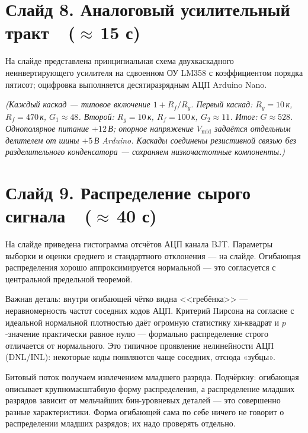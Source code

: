 \documentclass[12pt,a4paper]{extarticle}
\newcommand{\note}[1]{%
  \par
  {\small\color{noteclr}\itshape (#1)}%
  \par}
\begin{document}
\section*{Слайд 8. Аналоговый усилительный тракт~~($\approx$\,15 с)}

На слайде представлена принципиальная схема двухкаскадного неинвертирующего
усилителя на сдвоенном ОУ LM358 с коэффициентом порядка пятисот; оцифровка
выполняется десятиразрядным АЦП Arduino Nano.

\note{Каждый каскад --- типовое включение $1+R_f/R_g$. Первый каскад:
$R_g=10$\,к, $R_f=470$\,к, $G_1\approx 48$. Второй: $R_g=10$\,к,
$R_f=100$\,к, $G_2\approx 11$. Итог: $G\approx 528$. Однополярное питание
$+12$\,В; опорное напряжение $V_\mathrm{mid}$ задаётся отдельным делителем от
шины $+5$\,В Arduino. Каскады соединены резистивной связью без
разделительного конденсатора --- сохраняем низкочастотные компоненты.}

\section*{Слайд 9. Распределение сырого сигнала~~($\approx$\,40 с)}

На слайде приведена гистограмма отсчётов АЦП канала BJT. Параметры выборки
и оценки среднего и стандартного отклонения --- на слайде. Огибающая
распределения хорошо аппроксимируется нормальной --- это согласуется с
центральной предельной теоремой.

Важная деталь: внутри огибающей чётко видна <<гребёнка>> --- неравномерность
частот соседних кодов АЦП. Критерий Пирсона на согласие с идеальной нормальной
плотностью даёт огромную статистику хи-квадрат и $p$-значение практически
равное нулю --- формально распределение строго отличается от нормального.
Это типичное проявление нелинейности АЦП (DNL/INL): некоторые коды появляются
чаще соседних, отсюда «зубцы».

Битовый поток получаем извлечением младшего разряда. Подчёркну: огибающая
описывает крупномасштабную форму распределения, а распределение младших
разрядов зависит от мельчайших бин-уровневых деталей --- это совершенно
разные характеристики. Форма огибающей сама по себе ничего не говорит о
распределении младших разрядов; их надо проверять отдельно.
\end{document}

